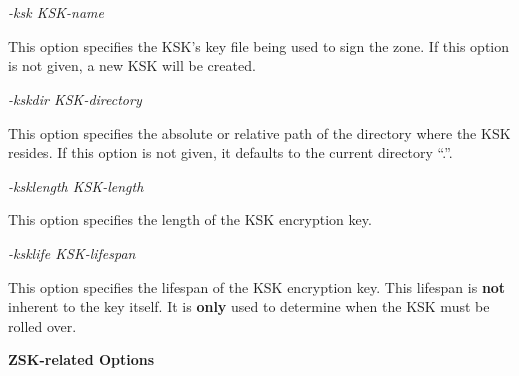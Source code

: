 \begin{description}

\item {\it -ksk KSK-name}\verb" "

This option specifies the KSK's key file being used to sign the zone.  If this
option is not given, a new KSK will be created.

\item {\it -kskdir KSK-directory}\verb" "

This option specifies the absolute or relative path of the directory
where the KSK resides.  If this option is not given, it defaults to
the current directory ``.''.

\item {\it -ksklength KSK-length}\verb" "

This option specifies the length of the KSK encryption key.

\item {\it -ksklife KSK-lifespan}\verb" "

This option specifies the lifespan of the KSK encryption key.  This lifespan
is {\bf not} inherent to the key itself.  It is {\bf only} used to determine
when the KSK must be rolled over.

\end{description}

{\bf ZSK-related Options}

